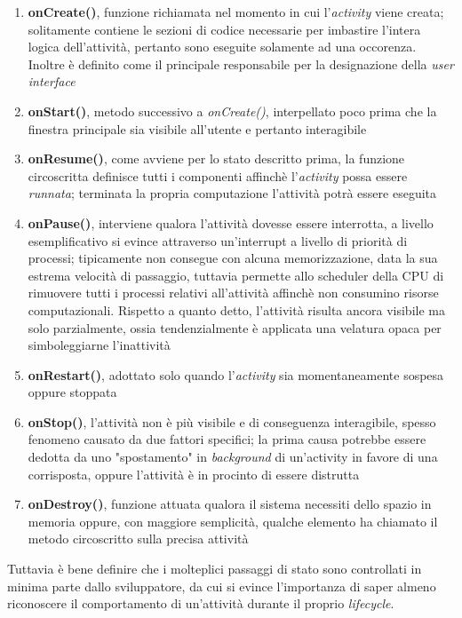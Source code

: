 \documentclass{article}
\begin{document}
\begin{enumerate}
  \itemsep0em 
  \renewcommand{\labelenumi}{-}
  \item \textbf{onCreate()}, funzione richiamata nel momento in cui l'\textit{activity} viene creata; solitamente contiene le sezioni di codice necessarie per imbastire l'intera logica dell'attività, pertanto sono eseguite solamente ad una occorenza. Inoltre è definito come il principale responsabile per la designazione della \textit{user interface}
  \item \textbf{onStart()}, metodo successivo a \textit{onCreate()}, interpellato poco prima che la finestra principale sia visibile all'utente e pertanto interagibile
  \item \textbf{onResume()}, come avviene per lo stato descritto prima, la funzione circoscritta definisce tutti i componenti affinchè l'\textit{activity} possa essere \textit{runnata}; terminata la propria computazione l'attività potrà essere eseguita
  \item \textbf{onPause()}, interviene qualora l'attività dovesse essere interrotta, a livello esemplificativo si evince attraverso un'interrupt a livello di priorità di processi; tipicamente non consegue con alcuna memorizzazione, data la sua estrema velocità di passaggio, tuttavia permette allo scheduler della CPU di rimuovere tutti i processi relativi all'attività affinchè non consumino risorse computazionali. Rispetto a quanto detto, l'attività risulta ancora visibile ma solo parzialmente, ossia tendenzialmente è applicata una velatura opaca per simboleggiarne l'inattività
  \item \textbf{onRestart()}, adottato solo quando l'\textit{activity} sia momentaneamente sospesa oppure stoppata
  \item \textbf{onStop()}, l'attività non è più visibile e di conseguenza interagibile, spesso fenomeno causato da due fattori specifici; la prima causa potrebbe essere dedotta da uno "spostamento" in \textit{background} di un'activity in favore di una corrisposta, oppure l'attività è in procinto di essere distrutta
  \item \textbf{onDestroy()}, funzione attuata qualora il sistema necessiti dello spazio in memoria oppure, con maggiore semplicità, qualche elemento ha chiamato il metodo circoscritto sulla precisa attività
\end{enumerate}   
Tuttavia è bene definire che i molteplici passaggi di stato sono controllati in minima parte dallo sviluppatore, da cui si evince l'importanza di saper almeno riconoscere il comportamento di un'attività durante il proprio \textit{lifecycle}.\vspace*{14pt}\\
\end{document}
